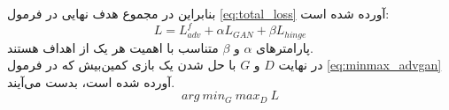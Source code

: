 بنابراین در مجموع هدف نهایی در فرمول 
\ref{eq:total_loss}
آورده شده است:
\begin{equation} \label{eq:total_loss}
	L = L^f_{adv} + \alpha L_{GAN} + \beta L_{hinge}
\end{equation}
پارامترهای $\alpha$ و $\beta$ متناسب با اهمیت هر یک از اهداف هستند.
\\
در نهایت $D$ و $G$ با حل شدن یک بازی کمین‌بیش
که در فرمول 
\ref{eq:minmax_advgan}
آورده شده است، بدست می‌آیند.
\begin{equation} \label{eq:minmax_advgan}
	arg\:min_G\:max_D\:L
\end{equation}
